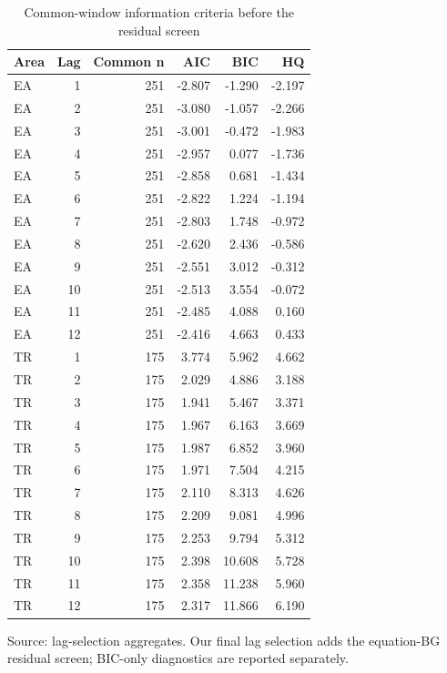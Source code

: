 \begin{table}[htbp]
\centering
\footnotesize
\caption{Common-window information criteria before the residual screen}
\begin{tabularx}{\linewidth}{Xrrrrr}
\toprule
Area & Lag & Common n & AIC & BIC & HQ \\
\midrule
EA & 1 & 251 & -2.807 & -1.290 & -2.197 \\
EA & 2 & 251 & -3.080 & -1.057 & -2.266 \\
EA & 3 & 251 & -3.001 & -0.472 & -1.983 \\
EA & 4 & 251 & -2.957 & 0.077 & -1.736 \\
EA & 5 & 251 & -2.858 & 0.681 & -1.434 \\
EA & 6 & 251 & -2.822 & 1.224 & -1.194 \\
EA & 7 & 251 & -2.803 & 1.748 & -0.972 \\
EA & 8 & 251 & -2.620 & 2.436 & -0.586 \\
EA & 9 & 251 & -2.551 & 3.012 & -0.312 \\
EA & 10 & 251 & -2.513 & 3.554 & -0.072 \\
EA & 11 & 251 & -2.485 & 4.088 & 0.160 \\
EA & 12 & 251 & -2.416 & 4.663 & 0.433 \\
TR & 1 & 175 & 3.774 & 5.962 & 4.662 \\
TR & 2 & 175 & 2.029 & 4.886 & 3.188 \\
TR & 3 & 175 & 1.941 & 5.467 & 3.371 \\
TR & 4 & 175 & 1.967 & 6.163 & 3.669 \\
TR & 5 & 175 & 1.987 & 6.852 & 3.960 \\
TR & 6 & 175 & 1.971 & 7.504 & 4.215 \\
TR & 7 & 175 & 2.110 & 8.313 & 4.626 \\
TR & 8 & 175 & 2.209 & 9.081 & 4.996 \\
TR & 9 & 175 & 2.253 & 9.794 & 5.312 \\
TR & 10 & 175 & 2.398 & 10.608 & 5.728 \\
TR & 11 & 175 & 2.358 & 11.238 & 5.960 \\
TR & 12 & 175 & 2.317 & 11.866 & 6.190 \\
\bottomrule
\end{tabularx}
\par\vspace{3pt}\begin{minipage}{\linewidth}\footnotesize Source: lag-selection aggregates.\allowbreak{} Our final lag selection adds the equation-BG residual screen; BIC-only diagnostics are reported separately.\allowbreak{}\end{minipage}
\end{table}
